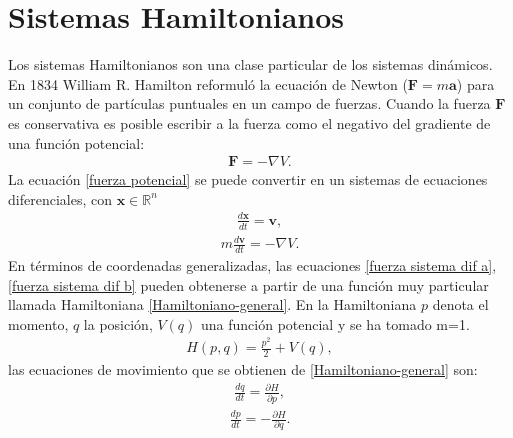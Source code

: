 \section{Sistemas Hamiltonianos}
Los sistemas Hamiltonianos son una clase particular de los sistemas dinámicos. En 1834 William R. Hamilton reformuló la ecuación de Newton ($\mathbf{F}=m\mathbf{a}$) para un conjunto de partículas puntuales en un campo de fuerzas. Cuando la fuerza $\mathbf{F}$ es conservativa es posible escribir a la fuerza como  el negativo del gradiente de una función potencial:
\begin{eqnarray}
\mathbf{F}=-\nabla V. \label{fuerza potencial}
\end{eqnarray}
La ecuación \eqref{fuerza potencial} se puede convertir en un sistemas de ecuaciones diferenciales, con $\mathbf{x} \in \mathbb{R}^{n}$
\begin{eqnarray}
\frac{d\mathbf{x}}{dt}=\mathbf{v},
\label{fuerza sistema dif a}
\end{eqnarray}
\begin{eqnarray}
m\frac{d\mathbf{v}}{dt}=-\nabla V.
\label{fuerza sistema dif b}
\end{eqnarray}
En términos de coordenadas generalizadas, las ecuaciones \ref{fuerza sistema dif a},\ref{fuerza sistema dif b} pueden obtenerse a partir de una función muy particular llamada Hamiltoniana \ref{Hamiltoniano-general}. En la Hamiltoniana $p$ denota el momento, $q$ la posición, $V(q)$ una función potencial y se ha tomado m=1.
\begin{eqnarray}
H(p,q)=\frac{p^{2}}{2}+V(q),
\label{Hamiltoniano-general}
\end{eqnarray}
las ecuaciones de movimiento que se obtienen de \ref{Hamiltoniano-general} son:
\begin{eqnarray}
\frac{dq}{dt}=\frac{\partial H}{\partial p},
\label{1ec de mov}
\end{eqnarray}
\begin{eqnarray}
\frac{dp}{dt}=-\frac{\partial H}{\partial q}.
\label{2ec de mov}
\end{eqnarray}

